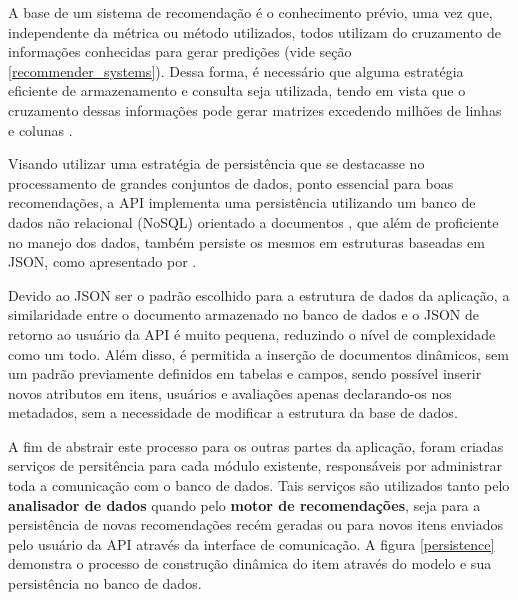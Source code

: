 \documentclass[12pt, openright, oneside, a4paper, brazil]{abntex2}
\begin{document}
A base de um sistema de recomendação é o conhecimento prévio, uma vez que, independente da métrica ou método utilizados, todos utilizam do cruzamento de informações conhecidas para gerar predições (vide seção \ref{recommender_systems}). Dessa forma, é necessário que alguma estratégia eficiente de armazenamento e consulta seja utilizada, tendo em vista que o cruzamento dessas informações pode gerar matrizes excedendo milhões de linhas e colunas \cite{gomez2016netflix}.

Visando utilizar uma estratégia de persistência que se destacasse no processamento de grandes conjuntos de dados, ponto essencial para boas recomendações, a API implementa uma persistência utilizando um banco de dados não relacional (NoSQL) orientado a documentos \cite{leavitt2010will}, que além de proficiente no manejo dos dados, também persiste os mesmos em estruturas baseadas em JSON, como apresentado por .

Devido ao JSON ser o padrão escolhido para a estrutura de dados da aplicação, a similaridade entre o documento armazenado no banco de dados e o JSON de retorno ao usuário da API é muito pequena, reduzindo o nível de complexidade como um todo. Além disso, é permitida a inserção de documentos dinâmicos, sem um padrão previamente definidos em tabelas e campos, sendo possível inserir novos atributos em itens, usuários e avaliações apenas declarando-os nos metadados, sem a necessidade de modificar a estrutura da base de dados.

A fim de abstrair este processo para os outras partes da aplicação, foram criadas serviços de persitência para cada módulo existente, responsáveis por administrar toda a comunicação com o banco de dados. Tais serviços são utilizados tanto pelo \textbf{analisador de dados} quando pelo \textbf{motor de recomendações}, seja para a persistência de novas recomendações recém geradas ou para novos itens enviados pelo usuário da API através da interface de comunicação. A figura \ref{persistence} demonstra o processo de construção dinâmica do item através do modelo e sua persistência no banco de dados.
\end{document}
